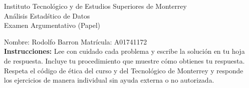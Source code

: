 \documentclass[10pt]{report}
\begin{document}
\newpage



\begin{center}
{\large Instituto Tecnol\'{o}gico y de Estudios Superiores de Monterrey \\
An\'alisis Estad\'stico de Datos } \\
Examen Argumentativo (Papel)
\end{center}

Nombre: \underline{\hspace*{.2in}}
Rodolfo Barron
\underline{\hspace*{.2in}} \quad Matr\'icula:\underline{\hspace*{.2in}}
A01741172
\underline{\hspace*{.2in}} \\

{\bf Instrucciones:} Lee con cuidado cada problema y escribe la soluci\'on
en tu hoja de respuesta. Incluye tu procedimiento que muestre c\'omo obtienes tu respuesta.  Respeta el c\'odigo de \'etica del curso y del Tecnol\'ogico de Monterrey y responde los ejercicios de manera individual sin ayuda externa o no autorizada.
\end{document}
